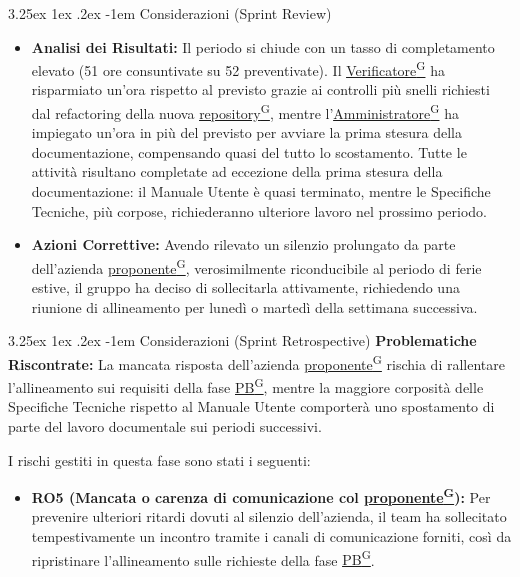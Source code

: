 \documentclass[a4paper,12pt]{article}
\makeatletter
\renewcommand\paragraph{\@startsection{paragraph}{5}{\z@}%
  {3.25ex \@plus1ex \@minus.2ex}%
  {-1em}%
  {\normalfont\normalsize\bfseries}}
\providecommand{\glslink}[2]{\href{https://alittlebyte-19.github.io/Documentazione/glossario.html\#gls-#1}{\underline{#2}\textsuperscript{\scriptsize G}}}
\makeatother
\begin{document}
\paragraph{Considerazioni (Sprint Review)}
\begin{itemize}
    \item \textbf{Analisi dei Risultati:} Il periodo si chiude con un tasso di completamento elevato (51 ore consuntivate su 52 preventivate). Il \glslink{verificatore}{Verificatore} ha risparmiato un'ora rispetto al previsto grazie ai controlli più snelli richiesti dal refactoring della nuova \glslink{repository}{repository}, mentre l'\glslink{amministratore}{Amministratore} ha impiegato un'ora in più del previsto per avviare la prima stesura della documentazione, compensando quasi del tutto lo scostamento. Tutte le attività risultano completate ad eccezione della prima stesura della documentazione: il Manuale Utente è quasi terminato, mentre le Specifiche Tecniche, più corpose, richiederanno ulteriore lavoro nel prossimo periodo.
    \item \textbf{Azioni Correttive:} Avendo rilevato un silenzio prolungato da parte dell'azienda \glslink{committente-proponente}{proponente}, verosimilmente riconducibile al periodo di ferie estive, il gruppo ha deciso di sollecitarla attivamente, richiedendo una riunione di allineamento per lunedì o martedì della settimana successiva.
\end{itemize}

\paragraph{Considerazioni (Sprint Retrospective)}
\textbf{Problematiche Riscontrate:} La mancata risposta dell'azienda \glslink{committente-proponente}{proponente} rischia di rallentare l'allineamento sui requisiti della fase \glslink{pb-product-baseline}{PB}, mentre la maggiore corposità delle Specifiche Tecniche rispetto al Manuale Utente comporterà uno spostamento di parte del lavoro documentale sui periodi successivi.

I rischi gestiti in questa fase sono stati i seguenti:
\begin{itemize}
    \item \textbf{RO5 (Mancata o carenza di comunicazione col \glslink{committente-proponente}{proponente}):} Per prevenire ulteriori ritardi dovuti al silenzio dell'azienda, il team ha sollecitato tempestivamente un incontro tramite i canali di comunicazione forniti, così da ripristinare l'allineamento sulle richieste della fase \glslink{pb-product-baseline}{PB}.
\end{itemize}
\end{document}
